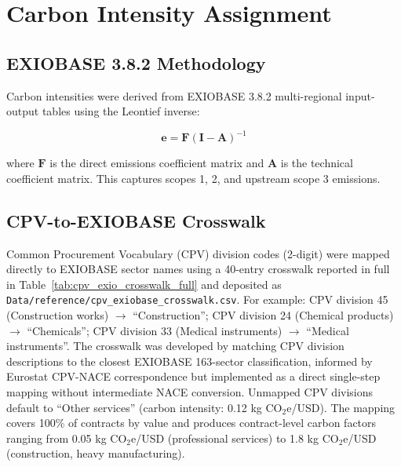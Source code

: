 \documentclass[11pt]{article}
\begin{document}
\section{Carbon Intensity Assignment}

\subsection{EXIOBASE 3.8.2 Methodology}

Carbon intensities were derived from EXIOBASE 3.8.2 multi-regional input-output tables using the Leontief inverse:

\begin{equation}
\mathbf{e} = \mathbf{F} (\mathbf{I} - \mathbf{A})^{-1}
\end{equation}

where $\mathbf{F}$ is the direct emissions coefficient matrix and $\mathbf{A}$ is the technical coefficient matrix. This captures scopes 1, 2, and upstream scope 3 emissions.

\subsection{CPV-to-EXIOBASE Crosswalk}

Common Procurement Vocabulary (CPV) division codes (2-digit) were mapped directly to EXIOBASE sector names using a 40-entry crosswalk reported in full in Table~\ref{tab:cpv_exio_crosswalk_full} and deposited as \texttt{Data/reference/cpv\_exiobase\_crosswalk.csv}. For example: CPV division 45 (Construction works) $\rightarrow$ ``Construction''; CPV division 24 (Chemical products) $\rightarrow$ ``Chemicals''; CPV division 33 (Medical instruments) $\rightarrow$ ``Medical instruments''. The crosswalk was developed by matching CPV division descriptions to the closest EXIOBASE 163-sector classification, informed by Eurostat CPV-NACE correspondence but implemented as a direct single-step mapping without intermediate NACE conversion. Unmapped CPV divisions default to ``Other services'' (carbon intensity: 0.12 kg CO$_2$e/USD). The mapping covers 100\% of contracts by value and produces contract-level carbon factors ranging from 0.05 kg CO$_2$e/USD (professional services) to 1.8 kg CO$_2$e/USD (construction, heavy manufacturing).

\end{document}
